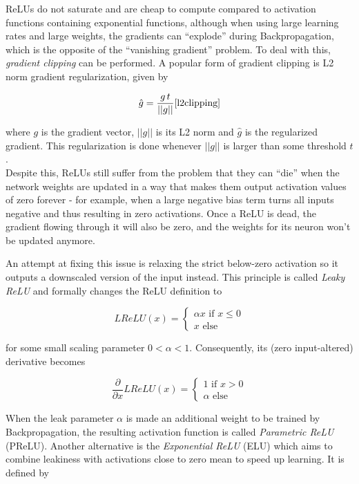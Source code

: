 ReLUs do not saturate and are cheap to compute compared to activation functions containing exponential functions, although when using large learning rates and large weights, the gradients can ``explode'' during Backpropagation, which is the opposite of the ``vanishing gradient'' problem. To deal with this, \textit{gradient clipping} can be performed. A popular form of gradient clipping is L2 norm gradient regularization, given by

\[ \hat{g} = \frac{g\,t}{||g||} \cite{l2clipping} \]

\noindent where $g$ is the gradient vector, $||g||$ is its L2 norm and $\hat{g}$ is the regularized gradient. This regularization is done whenever $||g||$ is larger than some threshold $t$.\\

\noindent Despite this, ReLUs still suffer from the problem that they can ``die'' when the network weights are updated in a way that makes them output activation values of zero forever - for example, when a large negative bias term turns all inputs negative and thus resulting in zero activations. Once a ReLU is dead, the gradient flowing through it will also be zero, and the weights for its neuron won't be updated anymore.

An attempt at fixing this issue is relaxing the strict below-zero activation so it outputs a downscaled version of the input instead. This principle is called \textit{Leaky ReLU} \cite{lrelu} and formally changes the ReLU definition to 

\[  LReLU(x) = \begin{cases}
			\alpha x \text{ if } x \leq 0\\
			x \text{ else}
		 \end{cases}
\]

\noindent for some small scaling parameter $0 < \alpha < 1$. Consequently, its (zero input-altered) derivative becomes

\[ \frac{\partial}{\partial x} LReLU(x) = \begin{cases}
							1 \text { if } x > 0\\
							\alpha \text{ else}
						        \end{cases}
\]

\noindent When the leak parameter $\alpha$ is made an additional weight to be trained by Backpropagation, the resulting activation function is called \textit{Parametric ReLU} (PReLU). Another alternative is the \textit{Exponential ReLU} (ELU) \cite{elu} which aims to combine leakiness with activations close to zero mean to speed up learning. It is defined by


